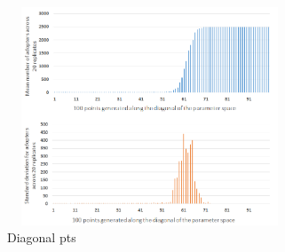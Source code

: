 \begin{figure}
    \centering
    \includegraphics[height=6.5cm,width=8.5cm]{AAMAS20Template-submission/figures/rappDiag.png}
    \caption{Diagonal pts}
    \label{fig:diagDisplay}
\end{figure}


